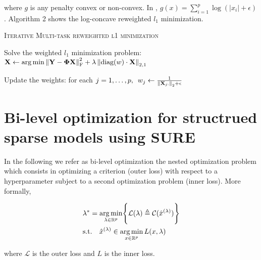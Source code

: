 \documentclass[a4paper,10pt]{article}
\theoremstyle{definition}
\begin{document}
where $g$ is any penalty convex or non-convex. In \cite{Candes_Wakin_Boyd08}, $g(x) = \sum_{i=1}^p \log(\lvert x_i \rvert + \epsilon)$. Algorithm 2 shows the log-concave reweighted $l_1$ minimization.

\vskip 0.2in

{\fontsize{4}{4}\selectfont
\begin{algorithm}[h]  %
\caption{\textsc{Iterative Multi-task reweighted l1 minimization}
}
%

    {
        Solve the weighted $l_1$ minimization problem:
        $\mathbf{X} \leftarrow \operatorname*{arg\,min} \left \lVert \mathbf{Y} -  \mathbf{\Phi} \mathbf{X} \right \rVert_{\text{F}}^2 + \lambda \left \lVert \text{diag}(w) \cdot \mathbf{X} \right \rVert_{2, 1}$

        Update the weights: for each
        $j = 1, \dots, p, \enspace w_j \leftarrow \frac{1}{\left \lVert \mathbf{X}_{j:} \right \rVert_2 + \epsilon}$
    }

\end{algorithm}
}

\newpage

\section{Bi-level optimization for structrued sparse models using SURE}
\label{section_6}

In the following we refer as bi-level optimization the nested optimization problem
which consists in optimizing a criterion (outer loss) with respect to a hyperparameter subject to
a second optimization problem (inner loss). More formally,

\begin{align*}
    &\lambda^* = \operatorname*{arg\,min}_{\lambda \in \mathbb{R}^p} \Biggl\{\mathcal{L}(\lambda) \triangleq \mathcal{C}(\hat{x}^{(\lambda)})\Biggr\} \\
    &\text{s.t.} \quad \hat{x}^{(\lambda)} \in \operatorname*{arg\,min}_{x \in \mathbb{R}^p} L(x, \lambda)
\end{align*}

where $\mathcal{L}$ is the outer loss and $L$ is the inner loss.
\end{document}
